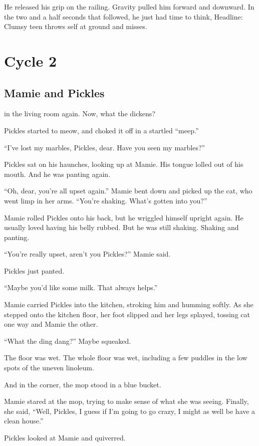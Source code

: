 He released his grip on the railing. Gravity pulled him forward and downward. In the two and a half seconds that followed, he just had time to think, Headline: Clumsy teen throws self at ground and misses.

\part{Cycle 2}

\chapter{Mamie and Pickles}

 in the living room again. Now, what the dickens?

Pickles started to meow, and choked it off in a startled “meep.”

“I’ve lost my marbles, Pickles, dear. Have you seen my marbles?”

Pickles sat on his haunches, looking up at Mamie. His tongue lolled out of his mouth. And he was panting again.

“Oh, dear, you’re all upset again.” Mamie bent down and picked up the cat, who went limp in her arms. “You’re shaking. What’s gotten into you?”

Mamie rolled Pickles onto his back, but he wriggled himself upright again. He usually loved having his belly rubbed. But he was still shaking. Shaking and panting.

“You’re really upset, aren’t you Pickles?” Mamie said.

Pickles just panted.

“Maybe you’d like some milk. That always helps.”

Mamie carried Pickles into the kitchen, stroking him and humming softly. As she stepped onto the kitchen floor, her foot slipped and her legs splayed, tossing cat one way and Mamie the other.

“What the ding dang?” Maybe squeaked.

The floor was wet. The whole floor was wet, including a few puddles in the low spots of the uneven linoleum.

And in the corner, the mop stood in a blue bucket.

Mamie stared at the mop, trying to make sense of what she was seeing. Finally, she said, “Well, Pickles, I guess if I’m going to go crazy, I might as well be have a clean house.”

Pickles looked at Mamie and quiverred.



